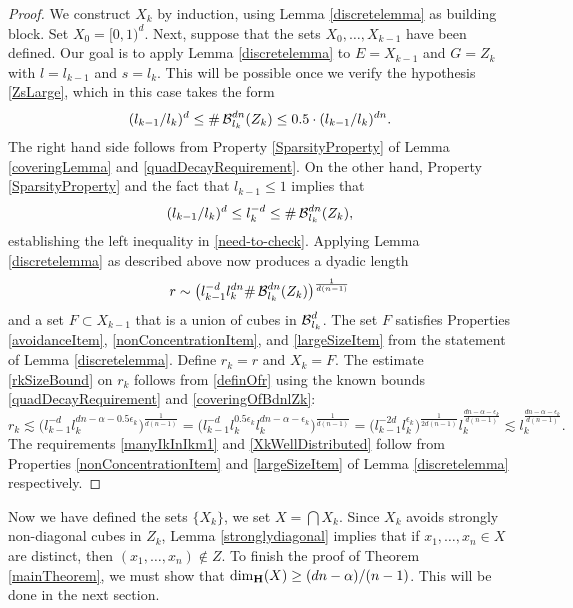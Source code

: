 \begin{proof}
	We construct $X_k$ by induction, using Lemma \ref{discretelemma} as building block. Set $X_0=[0,1)^d$. Next, suppose that the sets $X_0, \ldots, X_{k-1}$ have been defined. Our goal is to apply Lemma \ref{discretelemma} to $E = X_{k-1}$ and $G = Z_k$ with $l = l_{k-1}$ and $s = l_k$. This will be possible once we verify the hypothesis \eqref{ZsLarge}, which in this case takes the form
	\begin{equation}
		(l_{k-1}/l_k)^d \leq \#\operatorname{\mathcal{B}}_{l_k}^{dn}(Z_k) \leq 0.5 \cdot (l_{k-1}/l_k)^{dn}. \label{need-to-check}
	\end{equation}
	The right hand side follows from Property \ref{SparsityProperty} of Lemma \ref{coveringLemma} and \eqref{quadDecayRequirement}. 
	On the other hand, Property \ref{SparsityProperty} and the fact that $l_{k-1} \leq 1$ implies that
	\[ (l_{k-1}/l_k)^d\leq l_{k}^{-d}\leq \#\operatorname{\mathcal{B}}_{l_k}^{dn}(Z_k), \]
	establishing the left inequality in \eqref{need-to-check}. Applying Lemma \ref{discretelemma} as described above now produces a dyadic length
	\begin{equation}\label{definOfr}
		r \sim \big(l_{k-1}^{-d}l_k^{dn} \# \operatorname{\mathcal{B}}^{dn}_{l_k}(Z_k)\big)^{\frac{1}{d(n-1)}} 
	\end{equation}
	and a set $F\subset X_{k-1}$ that is a union of cubes in $\operatorname{\mathcal{B}}_{l_k}^{d}$. The set $F$ satisfies Properties \ref{avoidanceItem}, \ref{nonConcentrationItem}, and \ref{largeSizeItem} from the statement of Lemma \ref{discretelemma}. Define $r_k=r$ and $X_k=F$. The estimate  \eqref{rkSizeBound} on $r_k$ follows from \eqref{definOfr} using the known bounds \eqref{quadDecayRequirement} and \eqref{coveringOfBdnlZk}:
	\[ r_k \lesssim \bigl( l_{k-1}^{-d}  l_k^{dn -\alpha - 0.5 \epsilon_k} \bigr)^{\frac{1}{d(n-1)}} = \bigl( l_{k-1}^{-d} l_k^{0.5 \epsilon_k} l_k^{dn -\alpha - \epsilon_k} \bigr)^{\frac{1}{d(n-1)}} = \bigl( l_{k-1}^{-2d} l_k^{\epsilon_k}\bigr)^{\frac{1}{2d(n-1)}} l_{k}^{\frac{dn-\alpha -\epsilon_k}{d(n-1)}} \lesssim l_{k}^{\frac{dn-\alpha -\epsilon_k}{d(n-1)}}. \]
	The requirements \eqref{manyIkInIkm1} and \eqref{XkWellDistributed} follow from Properties \ref{nonConcentrationItem} and \ref{largeSizeItem} of Lemma \ref{discretelemma} respectively.
\end{proof} 

Now we have defined the sets $\{ X_k \}$, we set $X = \bigcap X_k$. Since $X_k$ avoids strongly non-diagonal cubes in $Z_k$, Lemma \ref{stronglydiagonal} implies that if $x_1, \dots, x_n \in X$ are distinct, then $(x_1, \dots, x_n) \not \in Z$. To finish the proof of Theorem \ref{mainTheorem}, we must show that $\operatorname{\dim_{\mathbf{H}}}(X) \geq (dn - \alpha)/(n - 1)$. This will be done in the next section. 







